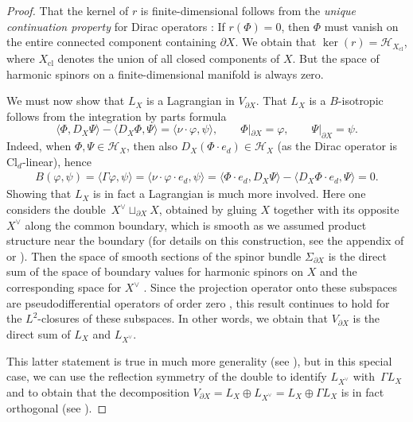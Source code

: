 \documentclass[pdftex]{sigma}
\numberwithin{equation}{section}
\newcommand{\Cl}{\mathrm{Cl}}
\begin{document}
\begin{proof}
That the kernel of $r$ is finite-dimensional follows from the \emph{unique continuation property} for Dirac operators \cite[Section~8]{BBW}: If $r(\Phi) = 0$, then $\Phi$ must vanish on the entire connected component containing $\partial X$.
We obtain that $ \ker(r) = \mathcal{H}_{X_{\mathrm{cl}}}$,
where $X_{\mathrm{cl}}$ denotes the union of all closed components of $X$.
But the space of harmonic spinors on a finite-dimensional manifold is always zero.

We must now show that $L_X$ is a Lagrangian in $V_{\partial X}$.
That $L_X$ is a $B$-isotropic follows from the integration by parts formula \cite[Theorem~3.2\,(5)]{BaerBallmannGuide}
\begin{equation*}
 \langle \Phi, D_X \Psi \rangle - \langle D_X \Phi, \Psi\rangle = \langle \nu \cdot \varphi,\psi\rangle, \qquad \Phi|_{\partial X} = \varphi,\qquad \Psi|_{\partial X} = \psi.
\end{equation*}
Indeed, when $\Phi, \Psi \in \mathcal{H}_X$, then also $D_X(\Phi \cdot e_d) \in \mathcal{H}_X$ (as the Dirac operator is $\Cl_d$-linear), hence
\begin{align*}
B(\varphi, \psi) = \langle \Gamma \varphi, \psi\rangle = \langle \nu \cdot \varphi \cdot e_d, \psi\rangle = \langle \Phi \cdot e_d, D_X \Psi \rangle - \langle D_X \Phi\cdot e_d, \Psi\rangle= 0.
\end{align*}
Showing that $L_X$ is in fact a Lagrangian is much more involved.
Here one considers the double~${X^\vee \sqcup_{\partial X} X}$, obtained by gluing $X$ together with its opposite $X^\vee$ along the common boundary, which is smooth as we assumed product structure near the boundary (for details on this construction, see the appendix of \cite{AmmannDahlHumbert} or \cite[Section~9]{BBW}).
Then the space of smooth sections of the spinor bundle $\Sigma_{\partial X}$ is the direct sum of the space of boundary values for harmonic spinors on $X$ and the corresponding space for $X^\vee$ \cite[Lemma 12.3]{BBW}.
Since the projection operator onto these subspaces are pseudodifferential operators of order zero \cite[Theorem~12.4]{BBW}, this result continues to hold for the $L^2$-closures of these subspaces.
In other words, we obtain that $V_{\partial X}$ is the direct sum of $L_X$ and $L_{X^\vee}$.

This latter statement is true in much more generality (see \cite[Section~XVII, Lemma B]{PalaisAtiyahSinger}), but in this special case, we can use the reflection symmetry of the double to identify $L_{X^\vee}$ with~$\Gamma L_X$ and to obtain that the decomposition $V_{\partial X} = L_X \oplus L_{X^\vee} = L_X \oplus \Gamma L_X$ is in fact orthogonal (see \cite[Theorem~3.12]{LudewigRoos}).
\end{proof}
\end{document}
